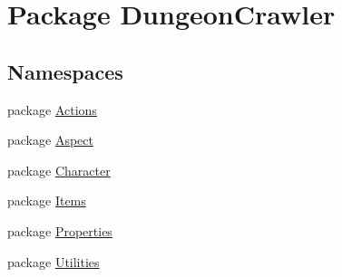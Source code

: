 \hypertarget{namespace_dungeon_crawler}{}\section{Package Dungeon\+Crawler}
\label{namespace_dungeon_crawler}
\subsection*{Namespaces}
\begin{DoxyCompactItemize}
\item 
package \hyperlink{namespace_dungeon_crawler_1_1_actions}{Actions}
\item 
package \hyperlink{namespace_dungeon_crawler_1_1_aspect}{Aspect}
\item 
package \hyperlink{namespace_dungeon_crawler_1_1_character}{Character}
\item 
package \hyperlink{namespace_dungeon_crawler_1_1_items}{Items}
\item 
package \hyperlink{namespace_dungeon_crawler_1_1_properties}{Properties}
\item 
package \hyperlink{namespace_dungeon_crawler_1_1_utilities}{Utilities}
\end{DoxyCompactItemize}
